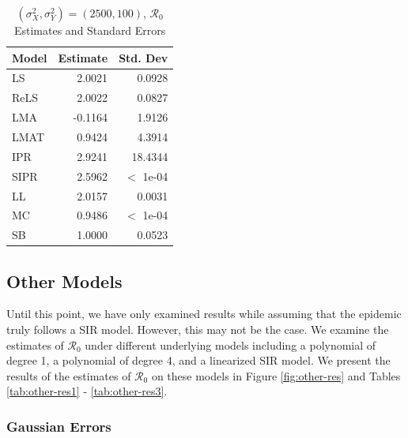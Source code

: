 \documentclass[12pt]{article}
\newcommand{\rr}{\ensuremath{\mathcal{R}_0}}
\begin{document}
\begin{table}[H]
	
	
	\centering
	\begin{tabular}[t]{l|r|r}
		\hline
		Model & Estimate & Std. Dev\\
		\hline
		LS & 2.0021 & 0.0928\\
		\hline
		ReLS & 2.0022 & 0.0827\\
		\hline
		LMA & -0.1164 & 1.9126\\
		\hline
		LMAT & 0.9424 & 4.3914\\
		\hline
		IPR & 2.9241 & 18.4344\\
		\hline
		SIPR & 2.5962 & $<$ 1e-04\\
		\hline
		LL & 2.0157 & 0.0031\\
		\hline
		MC & 0.9486 & $<$ 1e-04\\
		\hline
		SB & 1.0000 & 0.0523\\
		\hline
	\end{tabular}
	\caption{$(\sigma^2_X, \sigma^2_Y) = (2500, 100)$, $\rr$ Estimates and Standard Errors}
\end{table}

\subsection{Other Models}\label{sec:res-oth}
Until this point, we have only examined results while assuming that the epidemic truly follows a SIR model.  However, this may not be the case.  We examine the estimates of $\rr$ under different underlying models including a polynomial of degree 1, a polynomial of degree 4, and a linearized SIR model.  We present the results of the estimates of $\rr$ on these models in Figure \ref{fig:other-res} and Tables \ref{tab:other-res1} - \ref{tab:other-res3}.

\subsubsection{Gaussian Errors}
\end{document}
